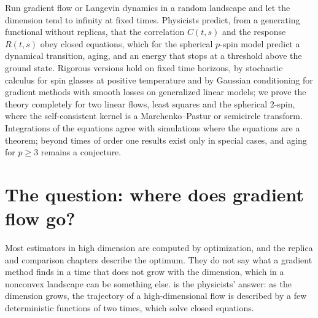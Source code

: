 \begin{refsection}

\newcommand{\dmftC}{\mathcal{C}}          %
\newcommand{\dmftE}{\mathcal{E}}          %
\newcommand{\dmftL}{\mathcal{L}}          %
\newcommand{\dmftM}{\mathcal{M}}          %
\newcommand{\dmftsp}{\mathrm{sp}}         %
\newcommand{\dmftGP}{\mathrm{GP}}         %

\begin{chaptersummary}
Run gradient flow or Langevin dynamics in a random landscape and let the dimension tend to infinity at fixed times. Physicists predict, from a generating functional without replicas, that the correlation $C(t,s)$ and the response $R(t,s)$ obey closed equations, which for the spherical $p$-spin model predict a dynamical transition, aging, and an energy that stops at a threshold above the ground state. Rigorous versions hold on fixed time horizons, by stochastic calculus for spin glasses at positive temperature and by Gaussian conditioning for gradient methods with smooth losses on generalized linear models; we prove the theory completely for two linear flows, least squares and the spherical $2$-spin, where the self-consistent kernel is a Marchenko--Pastur or semicircle transform. Integrations of the equations agree with simulations where the equations are a theorem; beyond times of order one results exist only in special cases, and aging for $p\ge3$ remains a conjecture.
\end{chaptersummary}

\section{The question: where does gradient flow go?}\label{sec:dmft:question}

Most estimators in high dimension are computed by optimization, and the replica and comparison chapters describe the optimum. They do not say what a gradient method finds in a time that does not grow with the dimension, which in a nonconvex landscape can be something else.  is the physicists' answer: as the dimension grows, the trajectory of a high-dimensional flow is described by a few deterministic functions of two times, which solve closed equations.


\end{refsection}
